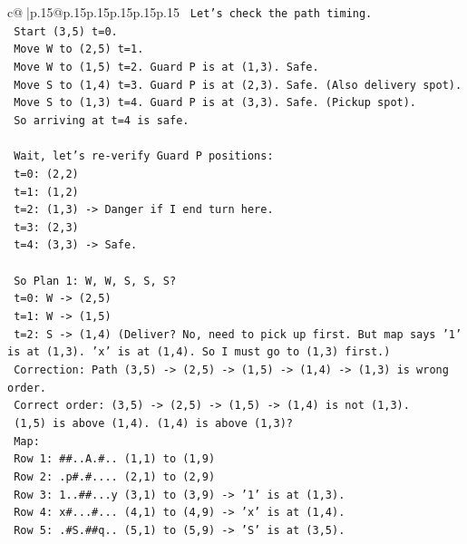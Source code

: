 \documentclass{article}
\begin{document}
{\begin{supertabular}{c@{$\;$}|p{.15\linewidth}@{}p{.15\linewidth}p{.15\linewidth}p{.15\linewidth}p{.15\linewidth}p{.15\linewidth}}
{{{\texttt{   Let's check the path timing.} \\
\texttt{   Start (3,5) t=0.} \\
\texttt{   Move W to (2,5) t=1.} \\
\texttt{   Move W to (1,5) t=2. Guard P is at (1,3). Safe.} \\
\texttt{   Move S to (1,4) t=3. Guard P is at (2,3). Safe. (Also delivery spot).} \\
\texttt{   Move S to (1,3) t=4. Guard P is at (3,3). Safe. (Pickup spot).} \\
\texttt{   So arriving at t=4 is safe.} \\
\\ 
\texttt{   Wait, let's re{-}verify Guard P positions:} \\
\texttt{   t=0: (2,2)} \\
\texttt{   t=1: (1,2)} \\
\texttt{   t=2: (1,3) {-}> Danger if I end turn here.} \\
\texttt{   t=3: (2,3)} \\
\texttt{   t=4: (3,3) {-}> Safe.} \\
\\ 
\texttt{   So Plan 1: W, W, S, S, S?} \\
\texttt{   t=0: W {-}> (2,5)} \\
\texttt{   t=1: W {-}> (1,5)} \\
\texttt{   t=2: S {-}> (1,4) (Deliver? No, need to pick up first. But map says '1' is at (1,3). 'x' is at (1,4). So I must go to (1,3) first.)} \\
\texttt{   Correction: Path (3,5) {-}> (2,5) {-}> (1,5) {-}> (1,4) {-}> (1,3) is wrong order.} \\
\texttt{   Correct order: (3,5) {-}> (2,5) {-}> (1,5) {-}> (1,4) is not (1,3).} \\
\texttt{   (1,5) is above (1,4). (1,4) is above (1,3)?} \\
\texttt{   Map:} \\
\texttt{   Row 1: \#\#..A.\#.. (1,1) to (1,9)} \\
\texttt{   Row 2: .p\#.\#.... (2,1) to (2,9)} \\
\texttt{   Row 3: 1..\#\#...y (3,1) to (3,9) {-}> '1' is at (1,3).} \\
\texttt{   Row 4: x\#...\#... (4,1) to (4,9) {-}> 'x' is at (1,4).} \\
\texttt{   Row 5: .\#S.\#\#q.. (5,1) to (5,9) {-}> 'S' is at (3,5).} \\
\\ 
}}}
\end{supertabular}}
\end{document}

